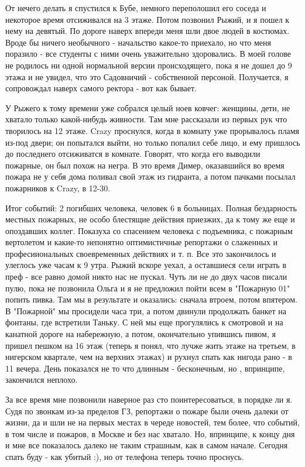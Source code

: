 \documentclass[12pt,a4paper]{article}
\begin{document}
От нечего делать я спустился к Бубе, немного переполошил его соседа и некоторое время отсиживался на 3 этаже. Потом позвонил Рыжий, и я пошел к нему на девятый. По дороге наверх впереди меня шли двое людей в костюмах. Вроде бы ничего необычного - начальство какое-то приехало, но что меня поразило - все студенты с ними очень уважительно здоровались. В моей голове не родилось ни одной нормальной версии происходящего, пока я не дошел до 9 этажа и не увидел, что это Садовничий - собственной персоной. Получается, я сопровождал наверх самого ректора - вот как бывает.

 У Рыжего к тому времени уже собрался целый ноев ковчег: женщины, дети, не хватало только какой-нибудь живности. Там мне рассказали из первых рук что творилось на 12 этаже. Crazy проснулся, когда в комнату уже прорывалось пламя из-под двери; он попытался выйти, но только попалил себе лицо, и ему пришлось до последнего отсиживатся в комнате. Говорят, что когда его выводили пожарные, он был похож на негра. В это время Димер, оказавшийся во время пожара не у себя дома поливал свой этаж из гидранта, а потом пачками посылал пожарников к Crazy, в 12-30. 

Итог событий: 2 погибших человека, человек 6 в больницах. Полная бездарность местных пожарных, не особо блестящие действия приезжих, да к тому же еще и опоздавших коллег. Показуха со спасением человека с подъемника, с пожарным вертолетом и какие-то непонятно оптимистичные репортажи о слаженных и професииональных своевременных действиях и т. п. Все это закончилось и улеглось уже часам к 9 утра. Рыжий вскоре уехал, а оставшиеся сели играть в преф - все равно домой никто нас не пускал. Чуть ли не до двух часов писали пулю, пока не позвонила Ольга и я не предложил пойти всем в "Пожарную 01" попить пивка. Там мы в результате и оказались: сначала втроем, потом впятером. В "Пожарной" мы просидели часа три, а потом двинули продолжать банкет на фонтаны, где встретили Таньку. С ней мы еще прогулялись к смотровой и на канатной дороге на набережную, а потом, окончательно упившись пивом, я пришел пешком на 16 этаж (теперь я понял, что лучже жить этаже на третьем, в нигерском квартале, чем на верхних этажах) и рухнул спать как нигода рано - в 11 вечера. День показался не то что длинным - бесконечным, но , впринципе, закончился неплохо.

За все время мне позвонили наверное раз сто поинтересоваться, в порядке ли я. Судя по звонкам из-за пределов ГЗ, репортажи о пожаре были очень далеки от жизни, да и шли не на первых местах в череде новостей, тем более, что событий, в том числе и пожаров, в Москве и без нас хватало. Но, впринципе, к концу дня и мне все показалось далеко не таким страшным, как в самом начале. Сегодня спать буду - как убитый :), но от телефона теперь точно проснусь.
\end{document}
